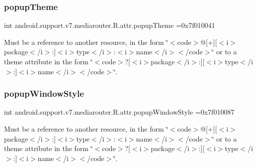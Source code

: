 \subsubsection{\texorpdfstring{popup\+Theme}{popupTheme}}
{\footnotesize\ttfamily int android.\+support.\+v7.\+mediarouter.\+R.\+attr.\+popup\+Theme =0x7f010041\hspace{0.3cm}{\ttfamily [static]}}

Must be a reference to another resource, in the form \char`\"{}$<$code$>$@\mbox{[}+\mbox{]}\mbox{[}$<$i$>$package$<$/i$>$\+:\mbox{]}$<$i$>$type$<$/i$>$\+:$<$i$>$name$<$/i$>$$<$/code$>$\char`\"{} or to a theme attribute in the form \char`\"{}$<$code$>$?\mbox{[}$<$i$>$package$<$/i$>$\+:\mbox{]}\mbox{[}$<$i$>$type$<$/i$>$\+:\mbox{]}$<$i$>$name$<$/i$>$$<$/code$>$\char`\"{}. \mbox{\label{classandroid_1_1support_1_1v7_1_1mediarouter_1_1R_1_1attr_a81365945964f66c87ae40a9a13b9c3c4}} 
\subsubsection{\texorpdfstring{popup\+Window\+Style}{popupWindowStyle}}
{\footnotesize\ttfamily int android.\+support.\+v7.\+mediarouter.\+R.\+attr.\+popup\+Window\+Style =0x7f010087\hspace{0.3cm}{\ttfamily [static]}}

Must be a reference to another resource, in the form \char`\"{}$<$code$>$@\mbox{[}+\mbox{]}\mbox{[}$<$i$>$package$<$/i$>$\+:\mbox{]}$<$i$>$type$<$/i$>$\+:$<$i$>$name$<$/i$>$$<$/code$>$\char`\"{} or to a theme attribute in the form \char`\"{}$<$code$>$?\mbox{[}$<$i$>$package$<$/i$>$\+:\mbox{]}\mbox{[}$<$i$>$type$<$/i$>$\+:\mbox{]}$<$i$>$name$<$/i$>$$<$/code$>$\char`\"{}. \mbox{\label{classandroid_1_1support_1_1v7_1_1mediarouter_1_1R_1_1attr_aa19f437997c712d66bbb1c7d5c68bd0b}} 
